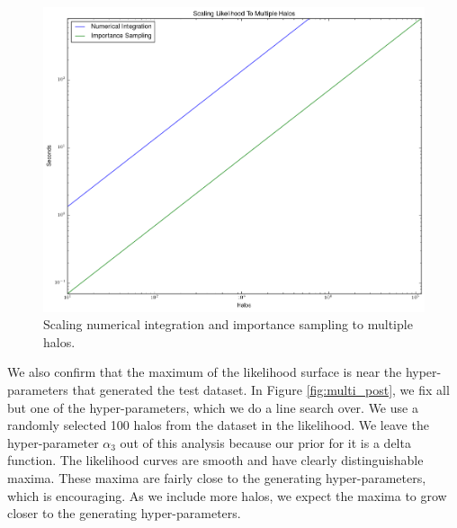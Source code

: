 \documentclass[\docopts]{\docclass}
\begin{document}
\begin{figure}[!h]
\centering
\includegraphics[width=0.9\columnwidth]{scaling.png}
\caption{
Scaling numerical integration and importance sampling to multiple halos.
\label{fig:scaling}}
\end{figure}

We also confirm that the maximum of the likelihood surface is near the hyper-parameters that generated the test dataset.
In Figure \ref{fig:multi_post}, we fix all but one of the hyper-parameters, which we do a line search over.
We use a randomly selected 100 halos from the dataset in the likelihood.
We leave the hyper-parameter $\alpha_3$ out of this analysis because our prior for it is a delta function.
The likelihood curves are smooth and have clearly distinguishable maxima.
These maxima are fairly close to the generating hyper-parameters, which is encouraging.
As we include more halos, we expect the maxima to grow closer to the generating hyper-parameters.
\end{document}
